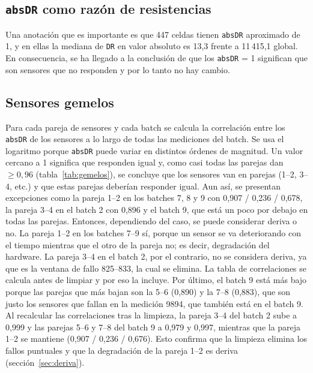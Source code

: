 \subsection{\texttt{absDR} como razón de resistencias}

Una anotación que es importante es que 447 celdas tienen \texttt{absDR} aproximado de 1, y en ellas
la mediana de \texttt{DR} en valor absoluto es 13,3 frente a 11\,415,1 global. En consecuencia, se
ha llegado a la conclusión de que los \texttt{absDR} = 1 significan que son sensores que no
responden y por lo tanto no hay cambio.

\subsection{Sensores gemelos}

Para cada pareja de sensores y cada batch se calcula la correlación entre los \texttt{absDR} de los
sensores a lo largo de todas las mediciones del batch. Se usa el logaritmo porque \texttt{absDR}
puede variar en distintos órdenes de magnitud. Un valor cercano a 1 significa que responden igual
y, como casi todas las parejas dan $\geq 0{,}96$ (tabla~\ref{tab:gemelos}), se concluye que los
sensores van en parejas (1--2, 3--4, etc.) y que estas parejas deberían responder igual. Aun así,
se presentan excepciones como la pareja 1--2 en los batches 7, 8 y 9 con 0,907 / 0,236 / 0,678, la
pareja 3--4 en el batch 2 con 0,896 y el batch 9, que está un poco por debajo en todas las parejas.
Entonces, dependiendo del caso, se puede considerar deriva o no. La pareja 1--2 en los batches 7--9
sí, porque un sensor se va deteriorando con el tiempo mientras que el otro de la pareja no; es
decir, degradación del hardware. La pareja 3--4 en el batch 2, por el contrario, no se considera
deriva, ya que es la ventana de fallo 825--833, la cual se elimina. La tabla de correlaciones se
calcula antes de limpiar y por eso la incluye. Por último, el batch 9 está más bajo porque las
parejas que más bajan son la 5--6 (0,890) y la 7--8 (0,883), que son justo los sensores que fallan
en la medición 9894, que también está en el batch 9. Al recalcular las correlaciones tras la
limpieza, la pareja 3--4 del batch 2 sube a 0,999 y las parejas 5--6 y 7--8 del batch 9 a 0,979 y
0,997, mientras que la pareja 1--2 se mantiene (0,907 / 0,236 / 0,676). Esto confirma que la
limpieza elimina los fallos puntuales y que la degradación de la pareja 1--2 es deriva
(sección~\ref{sec:deriva}).

